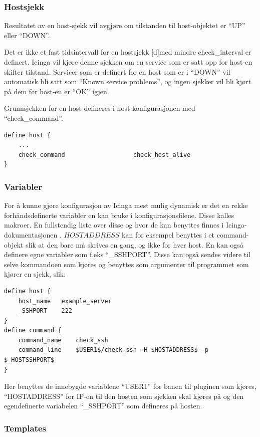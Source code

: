 \subsubsection{Hostsjekk}

Resultatet av en host-sjekk vil avgjøre om tilstanden til host-objektet er “UP” eller “DOWN”. 

Det er ikke et fast tidsintervall for en hostsjekk [d]med mindre check\_interval er definert. Icinga vil kjøre denne sjekken om en service som er satt opp for host-en skifter tilstand. Servicer som er definert for en host som er i “DOWN” vil automatisk bli satt som “Known service problems”, og ingen sjekker vil bli kjørt på dem før host-en er “OK” igjen.

Grunnsjekken for en host defineres i host-konfigurasjonen med “check\_command”.

\begin{lstlisting}
define host {
	...
	check_command                   check_host_alive
}
\end{lstlisting}

\subsubsection{Variabler}
For å kunne gjøre konfigurasjon av Icinga mest mulig dynamisk er det en rekke forhåndsdefinerte variabler en kan bruke i konfigurasjonsfilene. Disse kalles makroer. En fullstendig liste over disse og hvor de kan benyttes finnes i Icinga-dokumentasjonen \cite{icingamacro}. $HOSTADDRESS$ kan for eksempel benyttes i et command-objekt slik at den bare må skrives en gang, og ikke for hver host. En kan også definere egne variabler som f.eks “\_SSHPORT”. Disse kan også sendes videre til selve kommandoen som kjøres og benyttes som argumenter til programmet som kjører en sjekk, slik:

\begin{lstlisting}
define host {
	host_name	example_server
	_SSHPORT	222
}
define command {
	command_name	check_ssh
	command_line	$USER1$/check_ssh -H $HOSTADDRESS$ -p $_HOSTSSHPORT$
}
\end{lstlisting}

Her benyttes de innebygde variablene “USER1” for banen til pluginen som kjøres, “HOSTADDRESS” for IP-en til den hosten som sjekken skal kjøres på og den egendefinerte variabelen “\_SSHPORT” som defineres på hosten.

\subsubsection{Templates}

